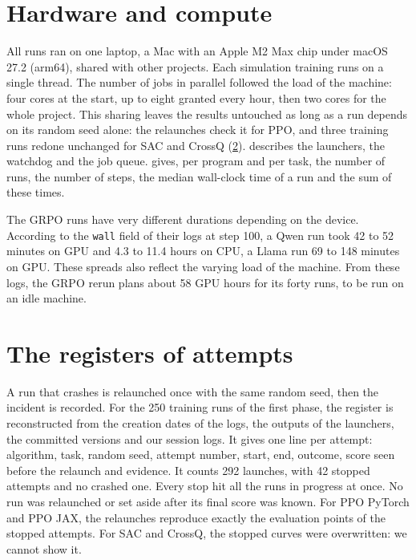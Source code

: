 \section{Hardware and compute}
\label{sec:log-calcul}

All runs ran on one laptop, a Mac with an Apple M2 Max chip under macOS 27.2 (arm64), shared
with other projects. Each simulation training runs on a single thread. The number of jobs in
parallel followed the load of the machine: four cores at the start, up to eight granted every hour,
then two cores for the whole project. This sharing leaves the results untouched as long as a run
depends on its random seed alone: the relaunches check it for PPO, and three training runs redone unchanged for SAC and CrossQ
(\cref{sec:registres}).  describes the launchers, the watchdog and the job queue.
 gives, per program and per task, the number of runs, the number of steps, the
median wall-clock time of a run and the sum of these times.

The GRPO runs have very different durations depending on the device. According to the \texttt{wall}
field of their logs at step 100, a Qwen run took 42 to 52 minutes on GPU and 4.3 to 11.4 hours on
CPU, a Llama run 69 to 148 minutes on GPU. These spreads also reflect the varying load of the
machine. From these logs, the GRPO rerun plans about 58 GPU hours for its forty runs, to be
run on an idle machine.

\section{The registers of attempts}
\label{sec:registres}

A run that crashes is relaunched once with the same random seed, then the incident is recorded. For
the 250 training runs of the first phase, the register  is
reconstructed from the creation dates of the logs, the outputs of the launchers, the committed
versions and our session logs. It gives one line per attempt: algorithm, task, random seed, attempt
number, start, end, outcome, score seen before the relaunch and evidence. It counts 292 launches,
with 42 stopped attempts and no crashed one. Every stop hit all the runs in progress at once. No run
was relaunched or set aside after its final score was known. For PPO PyTorch and PPO JAX, the
relaunches reproduce exactly the evaluation points of the stopped attempts. For SAC and CrossQ, the
stopped curves were overwritten: we cannot show it.

